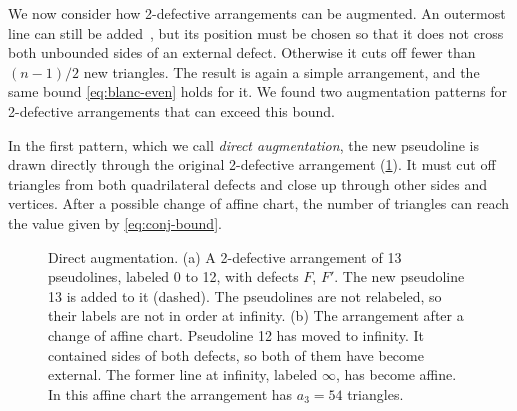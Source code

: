 We now consider how 2-defective arrangements can be augmented.
An outermost line can still be added~\cite[Proposition~5.1]{blanc11}, but its position must be chosen so that it does not cross both unbounded sides of an external defect. Otherwise it cuts off fewer than $(n-1)/2$ new triangles. The result is again a simple arrangement, and the same bound \eqref{eq:blanc-even} holds for it.
We found two augmentation patterns for 2-defective arrangements that can exceed this bound.

In the first pattern, which we call \emph{direct augmentation}, the new pseudoline is drawn directly through the original 2-defective arrangement (\cref{fig:direct}). It must cut off triangles from both quadrilateral defects and close up through other sides and vertices. After a possible change of affine chart, the number of triangles can reach the value given by \eqref{eq:conj-bound}.

\begin{figure}[p]
\centering
{}
\captionsetup[sub]{skip=-8pt}%
\begin{subfigure}[b]{0.75\linewidth}
\centering

\caption{}
\end{subfigure}

\vspace{2\bigskipamount}
\begin{subfigure}[b]{0.75\linewidth}
\centering

\caption{}
\end{subfigure}
\caption{Direct augmentation. (a) A 2-defective arrangement of 13 pseudolines, labeled 0 to 12, with defects $F$, $F'$. The new pseudoline 13 is added to it (dashed). The pseudolines are not relabeled, so their labels are not in order at infinity. (b) The arrangement after a change of affine chart. Pseudoline 12 has moved to infinity. It contained sides of both defects, so both of them have become external. The former line at infinity, labeled $\infty$, has become affine. In this affine chart the arrangement has $a_3=54$ triangles.}
\label{fig:direct}
\end{figure}

